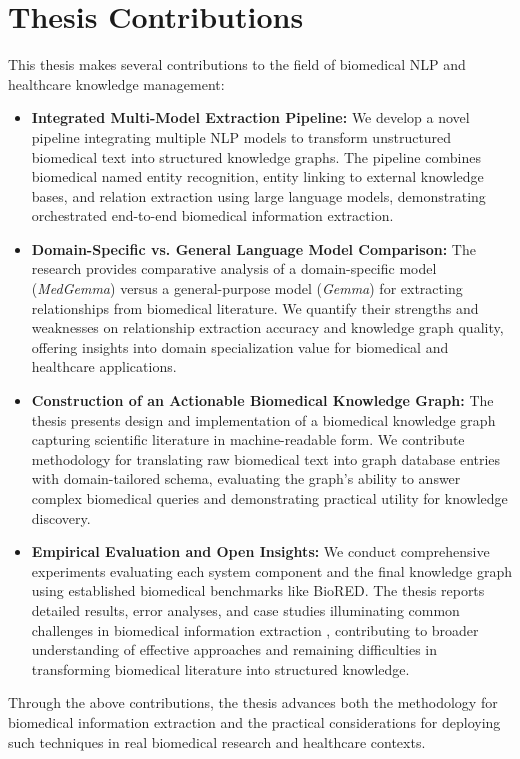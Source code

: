 
\section{Thesis Contributions}

This thesis makes several contributions to the field of biomedical NLP and healthcare knowledge management:

\begin{itemize}
  \item \textbf{Integrated Multi-Model Extraction Pipeline:} We develop a novel pipeline integrating multiple NLP models to transform unstructured biomedical text into structured knowledge graphs. The pipeline combines biomedical named entity recognition, entity linking to external knowledge bases, and relation extraction using large language models, demonstrating orchestrated end-to-end biomedical information extraction.

  \item \textbf{Domain-Specific vs. General Language Model Comparison:} The research provides comparative analysis of a domain-specific model (\emph{MedGemma}) versus a general-purpose model (\emph{Gemma}) for extracting relationships from biomedical literature. We quantify their strengths and weaknesses on relationship extraction accuracy and knowledge graph quality, offering insights into domain specialization value for biomedical and healthcare applications.

  \item \textbf{Construction of an Actionable Biomedical Knowledge Graph:} The thesis presents design and implementation of a biomedical knowledge graph capturing scientific literature in machine-readable form. We contribute methodology for translating raw biomedical text into graph database entries with domain-tailored schema, evaluating the graph's ability to answer complex biomedical queries and demonstrating practical utility for knowledge discovery.

  \item \textbf{Empirical Evaluation and Open Insights:} We conduct comprehensive experiments evaluating each system component and the final knowledge graph using established biomedical benchmarks like BioRED. The thesis reports detailed results, error analyses, and case studies illuminating common challenges in biomedical information extraction \parencite{Hier2025}, contributing to broader understanding of effective approaches and remaining difficulties in transforming biomedical literature into structured knowledge.
\end{itemize}

Through the above contributions, the thesis advances both the methodology for biomedical information extraction and the practical considerations for deploying such techniques in real biomedical research and healthcare contexts.